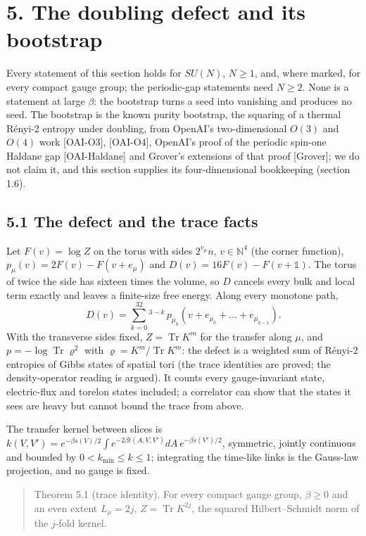 \documentclass[10pt,letterpaper,twocolumn]{article}
\begin{document}
\section{5. The doubling defect and its bootstrap}\label{5-the-doubling-defect-and-its-bootstrap}

Every statement of this section holds for \(SU(N)\), \(N\ge1\), and, where marked, for every compact gauge group; the periodic-gap statements need \(N\ge2\). None is a statement at large \(\beta\): the bootstrap turns a seed into vanishing and produces no seed. The bootstrap is the known purity bootstrap, the squaring of a thermal Rényi-2 entropy under doubling, from OpenAI's two-dimensional \(O(3)\) and \(O(4)\) work {[}OAI-O3{]}, {[}OAI-O4{]}, OpenAI's proof of the periodic spin-one Haldane gap {[}OAI-Haldane{]} and Grover's extensions of that proof {[}Grover{]}; we do not claim it, and this section supplies its four-dimensional bookkeeping (section 1.6).

\subsection{5.1 The defect and the trace facts}\label{51-the-defect-and-the-trace-facts}

Let \(F(v)=\log Z\) on the torus with sides \(2^{v_\mu}n\), \(v\in\mathbb N^4\) (the corner function), \(p_\mu(v)=2F(v)-F(v+e_\mu)\) and \(D(v)=16F(v)-F(v+\mathbb 1)\). The torus of twice the side has sixteen times the volume, so \(D\) cancels every bulk and local term exactly and leaves a finite-size free energy. Along every monotone path,
\[
D(v)=\sum_{k=0}^32^{3-k}\,p_{\mu_k}(v+e_{\mu_0}+\dots+e_{\mu_{k-1}}).\tag{5.1}
\]
With the transverse sides fixed, \(Z=\operatorname{Tr}K^m\) for the transfer along \(\mu\), and \(p=-\log\operatorname{Tr}\varrho^2\) with \(\varrho=K^m/\operatorname{Tr}K^m\): the defect is a weighted sum of Rényi-2 entropies of Gibbs states of spatial tori (the trace identities are proved; the density-operator reading is argued). It counts every gauge-invariant state, electric-flux and torelon states included; a correlator can show that the states it sees are heavy but cannot bound the trace from above.

The transfer kernel between slices is \(k(V,V')=e^{-\beta s(V)/2}\int e^{-2\beta t(A,V,V')}dA\,e^{-\beta s(V')/2}\), symmetric, jointly continuous and bounded by \(0<k_{\min}\le k\le1\); integrating the time-like links is the Gauss-law projection, and no gauge is fixed.

\begin{quote}
Theorem 5.1 (trace identity). For every compact gauge group, \(\beta\ge0\) and an even extent \(L_\mu=2j\), \(Z=\operatorname{Tr}K^{2j}\), the squared Hilbert--Schmidt norm of the \(j\)-fold kernel.
\end{quote}
\end{document}
